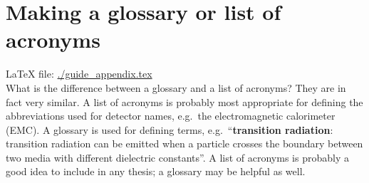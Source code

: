 



\chapter{Making a glossary or list of acronyms}%
\label{sec:app:glossary}

\LaTeX{} file: \url{./guide_appendix.tex}\\[1ex]
\noindent
What is the difference between a glossary and a list of acronyms? They
are in fact very similar. A list of acronyms is probably most
appropriate for defining the abbreviations used for detector names,
e.g.\ the electromagnetic calorimeter (EMC). A glossary is used for
defining terms, e.g.\ \enquote{\textbf{transition radiation}: transition
radiation can be emitted when a particle crosses the boundary between
two media with different dielectric constants}. A list of acronyms is
probably a good idea to include in any thesis; a glossary may be
helpful as well.


